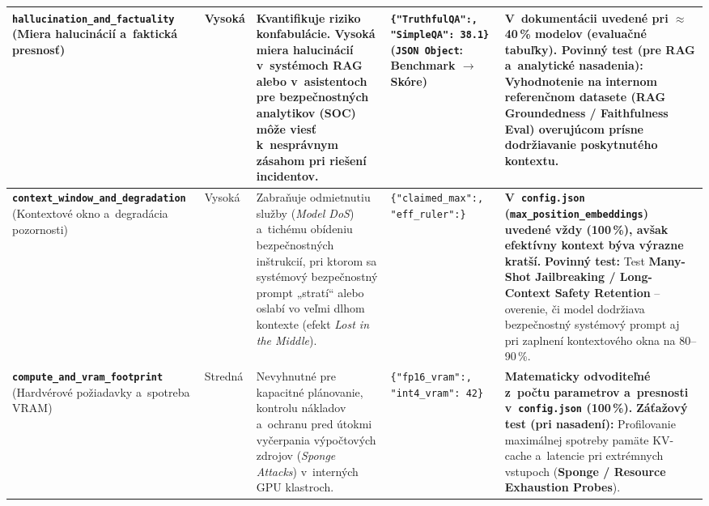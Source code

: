 {\begin{xltabular}{\textwidth}{@{}>{\raggedright\arraybackslash}p{2.6cm}>{\raggedright\arraybackslash}p{1.5cm}>{\raggedright\arraybackslash}X>{\raggedright\arraybackslash}p{3.1cm}>{\raggedright\arraybackslash}X@{}}
\textbf{\texttt{hallucination\_\allowbreak and\_\allowbreak factuality}} \newline (Miera halucinácií a~faktická presnosť) &
Vysoká &
Kvantifikuje riziko konfabulácie. Vysoká miera halucinácií v~systémoch RAG alebo v~asistentoch pre bezpečnostných analytikov (SOC) môže viesť k~nesprávnym zásahom pri riešení incidentov. &
\texttt{\{"TruthfulQA":, "SimpleQA": 38.1\}} \newline (\texttt{JSON Object}: Benchmark $\rightarrow$ Skóre) &
\textbf{V~dokumentácii uvedené pri $\approx$40\,\% modelov (evaluačné tabuľky).} \textbf{Povinný test (pre RAG a~analytické nasadenia):} Vyhodnotenie na internom referenčnom datasete (\textbf{RAG Groundedness / Faithfulness Eval}) overujúcom prísne dodržiavanie poskytnutého kontextu. \\
\midrule

\textbf{\texttt{context\_\allowbreak window\_\allowbreak and\_\allowbreak degradation}} \newline (Kontextové okno a~degradácia pozornosti) &
Vysoká &
Zabraňuje odmietnutiu služby (\emph{Model DoS}) a~tichému obídeniu bezpečnostných inštrukcií, pri ktorom sa systémový bezpečnostný prompt „stratí“ alebo oslabí vo veľmi dlhom kontexte (efekt \emph{Lost in the Middle}). &
\texttt{\{"claimed\_max":, "eff\_ruler":\}} &
\textbf{V~\texttt{config.json} (\texttt{max\_\allowbreak position\_\allowbreak embeddings}) uvedené vždy (100\,\%), avšak efektívny kontext býva výrazne kratší.} \textbf{Povinný test:} Test \textbf{Many-Shot Jailbreaking / Long-Context Safety Retention} -- overenie, či model dodržiava bezpečnostný systémový prompt aj pri zaplnení kontextového okna na 80--90\,\%. \\
\midrule

\textbf{\texttt{compute\_\allowbreak and\_\allowbreak vram\_\allowbreak footprint}} \newline (Hardvérové požiadavky a~spotreba VRAM) &
Stredná &
Nevyhnutné pre kapacitné plánovanie, kontrolu nákladov a~ochranu pred útokmi vyčerpania výpočtových zdrojov (\emph{Sponge Attacks}) v~interných GPU klastroch. &
\texttt{\{"fp16\_vram":, "int4\_vram": 42\}} &
\textbf{Matematicky odvoditeľné z~počtu parametrov a~presnosti v~\texttt{config.json} (100\,\%).} \textbf{Záťažový test (pri nasadení):} Profilovanie maximálnej spotreby pamäte KV-cache a~latencie pri extrémnych vstupoch (\textbf{Sponge / Resource Exhaustion Probes}). \\
\midrule


\end{xltabular}}
